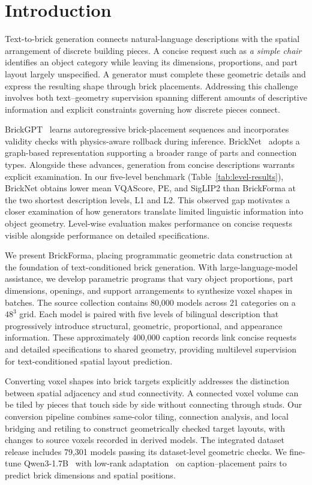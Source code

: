 \section{Introduction}
Text-to-brick generation connects natural-language descriptions with the spatial arrangement of discrete building pieces. A concise request such as \emph{a simple chair} identifies an object category while leaving its dimensions, proportions, and part layout largely unspecified. A generator must complete these geometric details and express the resulting shape through brick placements. Addressing this challenge involves both text--geometry supervision spanning different amounts of descriptive information and explicit constraints governing how discrete pieces connect.

BrickGPT~\cite{brickgpt} learns autoregressive brick-placement sequences and incorporates validity checks with physics-aware rollback during inference. BrickNet~\cite{bricknet} adopts a graph-based representation supporting a broader range of parts and connection types. Alongside these advances, generation from concise descriptions warrants explicit examination. In our five-level benchmark (Table~\ref{tab:level-results}), BrickNet obtains lower mean VQAScore, PE, and SigLIP2 than BrickForma at the two shortest description levels, L1 and L2. This observed gap motivates a closer examination of how generators translate limited linguistic information into object geometry. Level-wise evaluation makes performance on concise requests visible alongside performance on detailed specifications.

We present BrickForma, placing programmatic geometric data construction at the foundation of text-conditioned brick generation. With large-language-model assistance, we develop parametric programs that vary object proportions, part dimensions, openings, and support arrangements to synthesize voxel shapes in batches. The source collection contains 80,000 models across 21 categories on a $48^3$ grid. Each model is paired with five levels of bilingual description that progressively introduce structural, geometric, proportional, and appearance information. These approximately 400,000 caption records link concise requests and detailed specifications to shared geometry, providing multilevel supervision for text-conditioned spatial layout prediction.

Converting voxel shapes into brick targets explicitly addresses the distinction between spatial adjacency and stud connectivity. A connected voxel volume can be tiled by pieces that touch side by side without connecting through studs. Our conversion pipeline combines same-color tiling, connection analysis, and local bridging and retiling to construct geometrically checked target layouts, with changes to source voxels recorded in derived models. The integrated dataset release includes 79,301 models passing its dataset-level geometric checks. We fine-tune Qwen3-1.7B~\cite{qwen3} with low-rank adaptation~\cite{lora} on caption--placement pairs to predict brick dimensions and spatial positions.


